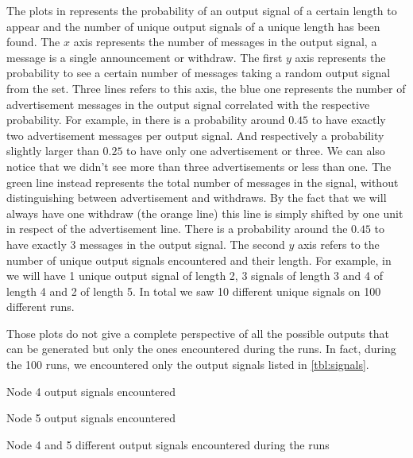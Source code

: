 The plots in  represents the probability of an
output signal of a certain length to appear and the number of unique output signals
of a unique length has been found.
The $x$ axis represents the number of messages in the output signal, a message
is a single announcement or withdraw.
The first $y$ axis represents the probability to see a certain number of messages
taking a random output signal from the set.
Three lines refers to this axis, the blue one represents the
number of advertisement messages in the output signal correlated with the
respective probability.
For example, in  there is a probability around $0.45$ to have
exactly two advertisement messages per output signal. And respectively a probability
slightly larger than $0.25$ to have only one advertisement or three.
We can also notice that we didn't see more than three advertisements or less than one.
The green line instead represents the total number of messages in the signal,
without distinguishing between advertisement and withdraws.
By the fact that we will always have one withdraw (the orange line) this line
is simply shifted by one unit in respect of the advertisement line.
There is a probability around the $0.45$ to have exactly \num{3} messages in the
output signal.
The second $y$ axis refers to the number of unique output signals encountered and
their length.
For example, in  we will have \num{1} unique output signal
of length \num{2}, \num{3} signals of length \num{3} and \num{4} of length \num{4}
and \num{2} of length \num{5}.
In total we saw \num{10} different unique signals on \num{100} different runs.

Those plots do not give a complete perspective of all the possible outputs
that can be generated but only the ones encountered during the runs.
In fact, during the \num{100} runs, we encountered only the output signals listed
in \cref{tbl:signals}.

\begin{table}[h]
	\begin{subtable}[h]{0.45\textwidth}
		
		\caption{Node \num{4} output signals encountered}
		\label{tab:node4_outSignals}
    \end{subtable}
	\hfill
	\begin{subtable}[h]{0.45\textwidth}
		
		\caption{Node \num{5} output signals encountered}
		\label{tab:node5_outSignals}
    \end{subtable}
	\caption{Node 4 and 5 different output signals encountered during the runs}
	\label{tbl:signals}
\end{table}


